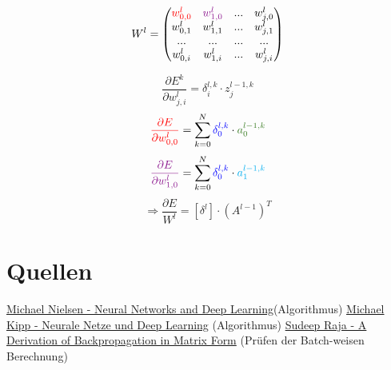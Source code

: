 \documentclass{article}
\begin{document}
\[ W^l = \begin{pmatrix}
    \textcolor{red}{w_{0,0}^l} & \textcolor{Plum}{w_{1,0}^l} & ... & w_{j,0}^l \\
    w_{0,1}^l & w_{1,1}^l & ... & w_{j,1}^l \\
    ... & ... & ... & ... \\
    w_{0,i}^l & w_{1,i}^l & ... & w_{j,i}^l
\end{pmatrix} \]



 \[ \frac{\partial E^k}{\partial w_{j,i}^{l}} = \delta_i^{l,k} \cdot z_j^{l-1,k} \]
 \[ \textcolor{red}{\frac{\partial E}{\partial w_{0,0}^l}} = 
 \sum_{k = 0}^{N} \textcolor{blue}{\delta_0^{l,k}} \cdot \textcolor{OliveGreen}{a_0^{l-1,k}} \]
  \[ \textcolor{Plum}{\frac{\partial E}{\partial w_{1,0}^l}} = 
 \sum_{k = 0}^{N} \textcolor{blue}{\delta_0^{l,k}} \cdot \textcolor{Cyan}{a_1^{l-1,k}} \]
\[ \Rightarrow \frac{\partial E}{W^l} = [\delta^l] \cdot (A^{l-1})^T \]


\section{Quellen}
\href{http://neuralnetworksanddeeplearning.com}{Michael Nielsen - Neural Networks and Deep Learning}(Algorithmus) \linebreak
\href{https://michaelkipp.de/deeplearning}{Michael Kipp - Neurale Netze und Deep Learning} (Algorithmus) \linebreak
\href{https://sudeepraja.github.io/Neural/}{Sudeep Raja - A Derivation of Backpropagation in Matrix Form} (Prüfen der Batch-weisen Berechnung)
\end{document}
